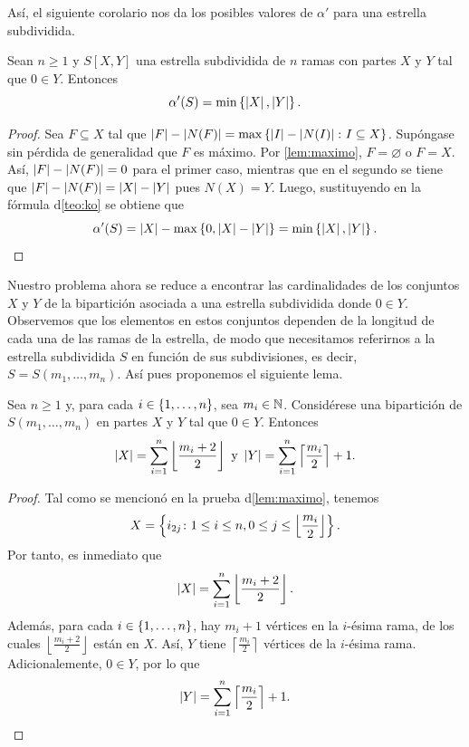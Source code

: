 As\'i, el siguiente corolario nos da los posibles valores de $\alpha'$ para una
estrella subdividida.

\begin{corolario}
\label{cor:posible-emparejamiento}
    Sean $n\geq 1$ y $S[X,Y]$ una estrella subdividida de $n$ ramas con partes
    $X$ y $Y$ tal que $0\in Y$. Entonces 
    \[
        \alpha'(S)=\min \left\{ \left|X\right|,\left|Y\right|\right\}.
    \]
\end{corolario}

\newpage

\begin{proof}
    Sea $F\subseteq X$ tal que $\left|F\right|-\left|N(F)\right| =
    \max\left\{ \left|I\right|-\left|N(I)\right|\colon I\subseteq X\right\}$. Sup\'ongase sin p\'erdida de
    generalidad que $F$ es m\'aximo. Por \cref{lem:maximo}, $F=\varnothing$ o
    $F=X$. As\'i, $\left|F\right|-\left|N(F)\right| = 0$ para el primer caso, mientras que en
    el segundo se tiene que $\left|F\right|-\left|N(F)\right| = \left|X\right| - \left|Y\right|$ pues
    $N(X)=Y$. Luego, sustituyendo en la f\'ormula d\cref{teo:ko} se obtiene que
    \[
        \alpha'(S)=\left|X\right| - \max\left\{ 0, \left|X\right| -\left|Y\right|\right\} = 
        \min \left\{ \left|X\right|,\left|Y\right|\right\}.
    \]
\end{proof}

Nuestro problema ahora se reduce a encontrar las cardinalidades de los conjuntos
$X$ y $Y$ de la bipartici\'on asociada a una estrella subdividida donde $0\in
Y$. Observemos que los elementos en estos conjuntos dependen de la longitud de
cada una de las ramas de la estrella, de modo que necesitamos referirnos a la
estrella subdividida $S$ en funci\'on de sus subdivisiones, es decir,
$S=S(m_1,\dots,m_n)$. As\'i pues proponemos el siguiente lema.

\begin{lema}
\label{lem:cardinalidades}
    Sea $n\geq 1$ y, para cada $i\in\{1,\dots, n\}$, sea $m_i\in \mathbb{N}$. Consid\'erese
    una bipartici\'on de $S(m_1,\dots,m_n)$ en partes $X$ y $Y$ tal que $0\in
    Y$. Entonces 
    \[
        \left|X\right| = \sum_{i=1}^{n} \left\lfloor \frac{m_i+2}{2} \right\rfloor 
        \text{ y } \left|Y\right| = \sum_{i=1}^{n} \left\lceil \frac{m_i}{2} 
        \right\rceil + 1.
    \]
\end{lema}

\begin{proof}
    Tal como se mencion\'o en la prueba d\cref{lem:maximo}, tenemos
    \[
        X=\left\{ i_{2j}\colon 1\leq i \leq n, 0\leq j\leq \left\lfloor 
        \frac{m_i}{2}\right\rfloor\right\}.
    \]
    Por tanto, es inmediato que 
    \[
        \left|X\right| = \sum_{i=1}^{n} \left\lfloor\frac{m_i + 2}{2}\right\rfloor.
    \]
    Adem\'as, para cada $i\in \{1,\dots, n\}$, hay $m_i + 1$ v\'ertices en la
    $i$-\'esima rama, de los cuales $\left\lfloor\frac{m_i + 2}{2}\right\rfloor$
    est\'an en $X$. As\'i, $Y$ tiene $\left\lceil\frac{m_i}{2}\right\rceil$
    v\'ertices de la $i$-\'esima rama. Adicionalemente, $0\in Y$, por lo que
    \[
        \left|Y\right| = \sum_{i=1}^{n} \left\lceil\frac{m_i}{2}\right\rceil + 1.
    \]

\end{proof}

